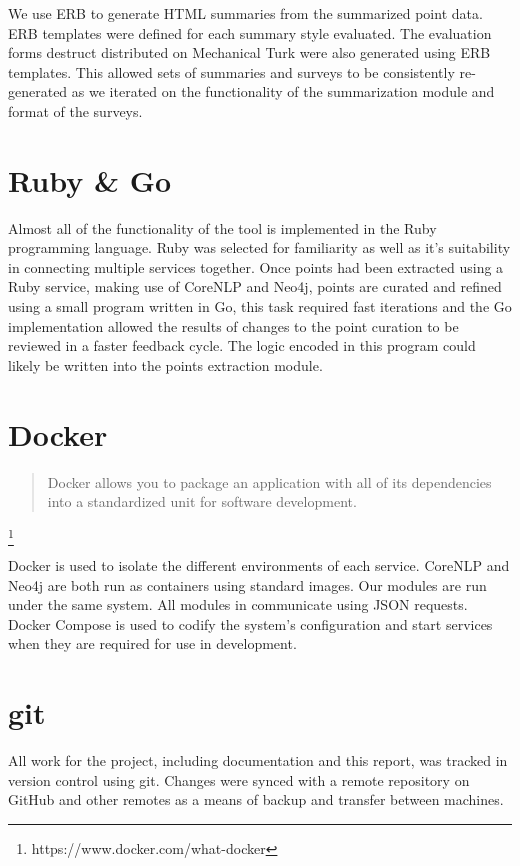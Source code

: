     We use ERB to generate HTML summaries from the summarized point data. ERB templates were defined for each summary style evaluated. The evaluation forms destruct distributed on Mechanical Turk were also generated using ERB templates. This allowed sets of summaries and surveys to be consistently re-generated as we iterated on the functionality of the summarization module and format of the surveys.

  \tocless\section{Ruby \& Go}
    Almost all of the functionality of the tool is implemented in the Ruby programming language. Ruby was selected for familiarity as well as it's suitability in connecting multiple services together. Once points had been extracted using a Ruby service, making use of CoreNLP and Neo4j, points are curated and refined using a small program written in Go, this task required fast iterations and the Go implementation allowed the results of changes to the point curation to be reviewed in a faster feedback cycle. The logic encoded in this program could likely be written into the points extraction module.

  \tocless\section{Docker}
    \blockquote{Docker allows you to package an application with all of its dependencies into a standardized unit for software development.} \footnote{https://www.docker.com/what-docker}

    Docker is used to isolate the different environments of each service. CoreNLP and Neo4j are both run as containers using standard images. Our modules are run under the same system. All modules in communicate using JSON requests. Docker Compose is used to codify the system's configuration and start services when they are required for use in development.

  \tocless\section{git}
    All work for the project, including documentation and this report, was tracked in version control using git. Changes were synced with a remote repository on GitHub and other remotes as a means of backup and transfer between machines.
